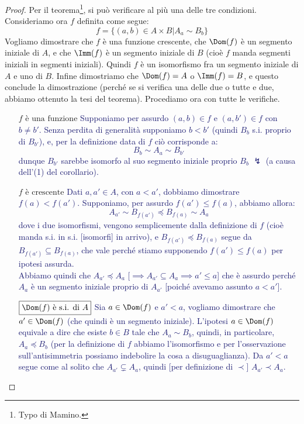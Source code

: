\documentclass[11pt]{scrartcl}
\begin{document}
\begin{proof}
	Per il teorema\footnote{Typo di Mamino.}, si può verificare al più una delle tre condizioni. Consideriamo ora $f$ definita come segue:
	\[ f = \{(a,b) \in A \times B | A_a \sim B_b\}
		\]
	Vogliamo dimostrare che $f$ è una funzione crescente, che $\Dom(f)$ è un segmento iniziale di $A$, e che $\Imm(f)$ è un segmento iniziale di $B$ (cioè $f$ manda segmenti iniziali in segmenti iniziali). Quindi $f$ è un isomorfismo fra un segmento iniziale di $A$ e uno di $B$.
	Infine dimostriamo che $\Dom(f) = A$ o $\Imm(f) = B$, e questo conclude la dimostrazione (perché se si verifica una delle due o tutte e due, abbiamo ottenuto la tesi del teorema). Procediamo ora con tutte le verifiche.
	\begin{itemize}
		\item[$\boxed{\text{$f$ è una funzione}}$] \textcolor{MidnightBlue}{Supponiamo per assurdo $(a,b) \in f$ e $(a,b') \in f$ con $b \ne b'$. Senza perdita di generalità supponiamo $b < b'$ (quindi $B_b$ s.i. proprio di $B_{b'}$), e, per la definizione data di $f$ ciò corrisponde a:
		\[ B_b \sim A_a \sim B_{b'}
			\]
		dunque $B_{b'}$ sarebbe isomorfo al suo segmento iniziale proprio $B_b$ $\lightning$ (a causa dell'(1) del corollario).}
		\item[$\boxed{\text{$f$ è crescente}}$] \textcolor{MidnightBlue}{Dati $a,a' \in A$, con $a<a'$, dobbiamo dimostrare $f(a) < f(a')$. Supponiamo, per assurdo $f(a') \leq f(a)$, abbiamo allora:
		\[ A_{a'} \sim B_{f(a')} \preceq B_{f(a)} \sim A_a
			\]
		dove i due isomorfismi, vengono semplicemente dalla definizione di $f$ (cioè manda s.i. in s.i. [isomorfi] in arrivo), e $B_{f(a')} \preceq B_{f(a)}$ segue da $B_{f(a')} \subseteq B_{f(a)}$, che vale perché stiamo supponendo $f(a') \leq f(a)$ per ipotesi assurda.\\
		Abbiamo quindi che $A_{a'}\preceq A_a$ [$\implies A_{a'}\subseteq A_a \implies a' \leq a$] che è assurdo perché $A_a$ è un segmento iniziale proprio di $A_{a'}$ [poiché avevamo assunto $a<a'$].}
		\item[$\boxed{\text{$\Dom(f)$ è s.i. di $A$}}$] \textcolor{MidnightBlue}{Sia $a \in \Dom(f)$ e $a' < a$, vogliamo dimostrare che $a' \in \Dom(f)$ (che quindi è un segmento iniziale). L'ipotesi $a \in \Dom(f)$ equivale a dire che esiste $b \in B$ tale che $A_a \sim B_b$,
		quindi, in particolare, $A_a \preceq B_b$ (per la definizione di $f$ abbiamo l'isomorfismo e per l'osservazione sull'antisimmetria possiamo indebolire la cosa a disuguaglianza).
		Da $a'<a$ segue come al solito che $A_{a'} \subsetneq A_a$, quindi [per definizione di $\prec$] $A_{a'} \prec A_a$.\\
}
\end{itemize}
\end{proof}
\end{document}
